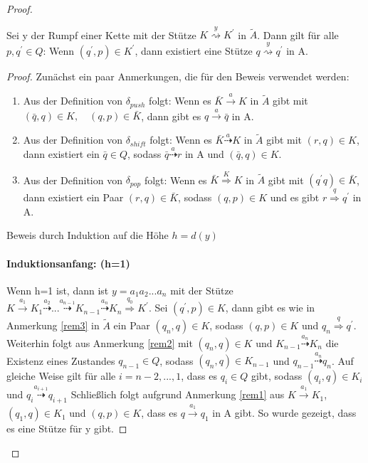 \begin{proof}
\begin{lemma}
\label{lemma_deter2}
Sei y der Rumpf einer Kette mit der Stütze $K \stackrel{y}{\rightsquigarrow} K^\prime$ in $\tilde{A}$. Dann gilt für alle $p, q^\prime \in Q$: Wenn $(q^\prime, p) \in K^\prime$, dann existiert eine Stütze $q \stackrel{y}{\rightsquigarrow} q^\prime$ in A.
\end{lemma}
\begin{proof}
Zunächst ein paar Anmerkungen, die für den Beweis verwendet werden:
\renewcommand{\labelenumi}{\roman{enumi})}
\begin{enumerate}
\item
Aus der Definition von $\delta_{push}$ folgt: Wenn es $\bar{K} \stackrel{a}{\rightarrow} K$ in $\tilde{A}$ gibt mit $(\bar{q}, q) \in K, \quad (q,p) \in \bar{K}$, dann gibt es $q \stackrel{a}{\rightarrow} \bar{q}$ in A.
\label{rem1}
\item
Aus der Definition von $\delta_{shift}$ folgt: Wenn es $\bar{K} \stackrel{a}{\dashrightarrow} K$ in $\tilde{A}$ gibt mit $(r,q) \in K$, dann existiert ein $\bar{q} \in Q$, sodass $\bar{q} \stackrel{a}{\dashrightarrow} r$ in A und $(\bar{q}, q) \in K$.
\label{rem2}
\item
Aus der Definition von $\delta_{pop}$ folgt: Wenn es $\bar{K} \stackrel{K}{\Rightarrow} K$ in $\tilde{A}$ gibt mit $(q^\prime q) \in \bar{K}$, dann existiert ein Paar $(r,q) \in \bar{K}$, sodass $(q,p)\in K$ und es gibt $r \stackrel{q}{\Rightarrow} q^\prime$ in A.
\label{rem3}
\end{enumerate}

Beweis durch Induktion auf die Höhe $h=d(y)$ 
\paragraph*{Induktionsanfang: (h=1)}
Wenn h=1 ist, dann ist $y=a_1a_2...a_n$ mit der Stütze $K\stackrel{a_1}{\rightarrow} K_1 \stackrel{a_2}{\dashrightarrow} ... \stackrel{a_{n-1}}{\dashrightarrow} K_{n-1} \stackrel{a_n}{\dashrightarrow} K_n \stackrel {q_0} {\Rightarrow} K^\prime.$ Sei $(q^\prime, p) \in K$, dann gibt es wie in Anmerkung \ref{rem3} in $\tilde{A}$ ein Paar $(q_n, q) \in K$, sodass $(q,p) \in K$ und $q_n \stackrel{q}{\Rightarrow} q^\prime$. Weiterhin folgt aus Anmerkung \ref{rem2} mit $(q_n, q) \in K$ und  $K_{n-1} \stackrel{a_n}{\dashrightarrow} K_n$ die Existenz eines Zustandes $q_{n-1} \in Q$, sodass $(q_n,q) \in K_{n-1}$ und $q_{n-1} \stackrel{a_n}{\dashrightarrow} q_n$. Auf gleiche Weise gilt für alle $i=n-2,...,1$, dass es $q_i \in Q$ gibt, sodass $(q_i,q) \in K_i$ und $q_i \stackrel{a_{i+1}}{\dashrightarrow} q_{i+1}$ Schließlich folgt aufgrund Anmerkung \ref{rem1} aus $K\stackrel{a_1}{\rightarrow} K_1$, $(q_1, q) \in K_1$ und $(q, p) \in K$, dass es $q \stackrel{a_1}{\rightarrow} q_1$ in A gibt. So wurde gezeigt, dass es eine Stütze für y gibt.

\end{proof}
\end{proof}
